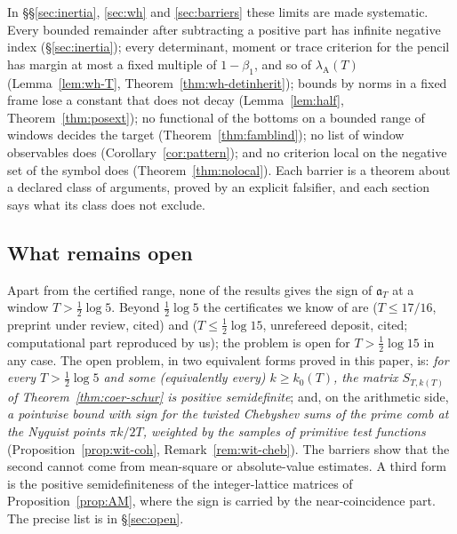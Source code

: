 \documentclass[11pt]{amsart}
\theoremstyle{definition}
\theoremstyle{remark}
\newcommand{\lamA}{\lambda_{\mathrm A}(T)}
\begin{document}
In \S\S\ref{sec:inertia}, \ref{sec:wh} and \ref{sec:barriers} these limits are made systematic. Every
bounded remainder after subtracting a positive part has infinite negative index (\S\ref{sec:inertia}); every
determinant, moment or trace criterion for the pencil has margin at most a fixed multiple of $1-\beta_1$, and
so of $\lamA$ (Lemma~\ref{lem:wh-T}, Theorem~\ref{thm:wh-detinherit}); bounds by norms in a fixed frame lose a
constant that does not decay (Lemma~\ref{lem:half}, Theorem~\ref{thm:posext}); no functional of the bottoms on a
bounded range of windows decides the target (Theorem~\ref{thm:famblind}); no list of window observables does
(Corollary~\ref{cor:pattern}); and no criterion local on the negative set of the symbol does
(Theorem~\ref{thm:nolocal}). Each barrier is a theorem about a declared class of arguments, proved by an explicit
falsifier, and each section says what its class does not exclude.

\subsection{What remains open}
Apart from the certified range, none of the results gives the sign of $\mathfrak a_T$ at a window
$T>\frac12\log5$. Beyond $\frac12\log5$ the certificates we know of are \cite{Liu2026}
($T\le17/16$, preprint under review, cited) and \cite{Mori15} ($T\le\frac12\log15$, unrefereed deposit,
cited; computational part reproduced by us); the problem is open for $T>\frac12\log15$ in any case. The open problem, in two equivalent forms proved in this paper, is: \emph{for every
$T>\frac12\log5$ and some (equivalently every) $k\ge k_0(T)$, the matrix $S_{T,k(T)}$ of
Theorem~\ref{thm:coer-schur} is positive semidefinite}; and, on the arithmetic side, \emph{a pointwise bound with
sign for the twisted Chebyshev sums of the prime comb at the Nyquist points $\pi k/2T$, weighted by the samples
of primitive test functions} (Proposition~\ref{prop:wit-coh}, Remark~\ref{rem:wit-cheb}). The barriers show that
the second cannot come from mean-square or absolute-value estimates. A third form is the positive semidefiniteness of the
integer-lattice matrices of Proposition~\ref{prop:AM}, where the sign is carried by the near-coincidence part. The precise
list is in \S\ref{sec:open}.
\end{document}
